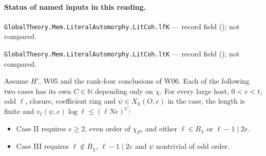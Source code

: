 

\paragraph{Status of named inputs in this reading.}
\noindent\nolinkurl{GlobalTheory.Mem.LiteralAutomorphy.LitCoh.lfK} --- record field (); not compared.\par
\noindent\nolinkurl{GlobalTheory.Mem.LiteralAutomorphy.LitCoh.ltK} --- record field (); not compared.\par

\begin{formalstatement}\label{sub:W09}
Assume $H'$, W05 and the rank-four conclusions of W06. Each of the
following two cases has its own $C\in\mathbb N$ depending only on
$\chi$. For every large host, $0<e<t$, odd $\ell$, closure, coefficient
ring and $\psi\in X_h(O,e)$ in the case, the length is finite and
$v_\ell(\psi,e)\log\ell\le(\ell Ne)^C$:
\begin{itemize}
\item Case II requires $e\ge2$, even order of $\chi_P$, and either
$\ell\in B_\chi$ or $\ell-1\mid2e$.
\item Case III requires $\ell\notin B_\chi$, $\ell-1\mid2e$ and
$\psi$ nontrivial of odd order.
\end{itemize}
\end{formalstatement}

